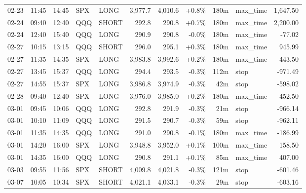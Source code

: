 \documentclass[11pt,a4paper,twoside]{article}
\begin{document}
\begin{center}
\begin{longtable}{>{\color{txtmain}}l l l l l r r r r >{\color{txtmain}}l r}
02-23 & 11:45 & 14:45 & SPX & LONG & 3,977.7 & 4,010.6 & \textcolor{wingreen}{+0.8\%} & 180m & max\_time & \textcolor{wingreen}{1,647.50} \\
02-24 & 09:40 & 12:40 & QQQ & SHORT & 292.8 & 290.8 & \textcolor{wingreen}{+0.7\%} & 180m & max\_time & \textcolor{wingreen}{2,200.00} \\
02-24 & 12:40 & 15:40 & QQQ & LONG & 290.9 & 290.8 & \textcolor{lossred}{-0.0\%} & 180m & max\_time & \textcolor{lossred}{-77.02} \\
02-27 & 10:15 & 13:15 & QQQ & SHORT & 296.0 & 295.1 & \textcolor{wingreen}{+0.3\%} & 180m & max\_time & \textcolor{wingreen}{945.99} \\
02-27 & 11:35 & 14:35 & SPX & LONG & 3,983.8 & 3,992.6 & \textcolor{wingreen}{+0.2\%} & 180m & max\_time & \textcolor{wingreen}{443.50} \\
02-27 & 13:45 & 15:37 & QQQ & LONG & 294.4 & 293.5 & \textcolor{lossred}{-0.3\%} & 112m & stop & \textcolor{lossred}{-971.49} \\
02-27 & 14:55 & 15:37 & SPX & LONG & 3,986.8 & 3,974.9 & \textcolor{lossred}{-0.3\%} & 42m & stop & \textcolor{lossred}{-598.02} \\
02-28 & 09:40 & 12:40 & SPX & LONG & 3,976.0 & 3,985.0 & \textcolor{wingreen}{+0.2\%} & 180m & max\_time & \textcolor{wingreen}{452.50} \\
03-01 & 09:45 & 10:06 & QQQ & LONG & 292.8 & 291.9 & \textcolor{lossred}{-0.3\%} & 21m & stop & \textcolor{lossred}{-966.14} \\
03-01 & 10:10 & 11:09 & QQQ & LONG & 291.5 & 290.7 & \textcolor{lossred}{-0.3\%} & 59m & stop & \textcolor{lossred}{-962.11} \\
03-01 & 11:35 & 14:35 & QQQ & LONG & 291.0 & 290.8 & \textcolor{lossred}{-0.1\%} & 180m & max\_time & \textcolor{lossred}{-186.99} \\
03-01 & 14:20 & 16:00 & SPX & LONG & 3,948.8 & 3,952.0 & \textcolor{wingreen}{+0.1\%} & 100m & max\_time & \textcolor{wingreen}{158.50} \\
03-01 & 14:35 & 16:00 & QQQ & LONG & 290.8 & 291.1 & \textcolor{wingreen}{+0.1\%} & 85m & max\_time & \textcolor{wingreen}{407.00} \\
03-03 & 09:55 & 11:56 & SPX & SHORT & 4,009.8 & 4,021.8 & \textcolor{lossred}{-0.3\%} & 121m & stop & \textcolor{lossred}{-601.46} \\
03-07 & 10:05 & 10:34 & SPX & SHORT & 4,021.1 & 4,033.1 & \textcolor{lossred}{-0.3\%} & 29m & stop & \textcolor{lossred}{-603.16} \\

\end{longtable}
\end{center}
\end{document}
